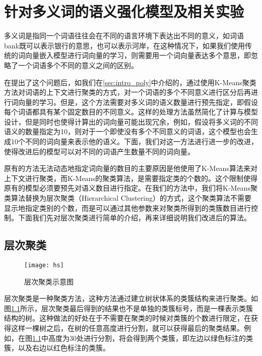 \iffalse



\fi

\chapter{针对多义词的语义强化模型及相关实验}

多义词是指同一个词语往往会在不同的语言环境下表达出不同的意义，如词语bank既可以表示银行的意思，也可以表示河岸，在这种情况下，如果我们使用传统的词向量嵌入模型进行词向量的学习，则需要用一个词向量表达多个意思，即忽略了一个词语多个不同的意义之间的区别。

在\citep{bengio2006neural}提出了这个问题后，如我们在\ref{sec:intro_poly}中介绍的，\citep{huang2012improving}通过使用K-Means聚类方法对词语的上下文进行聚类的方式，对一个词语的多个不同意义进行区分后再进行词向量的学习。但是，这个方法需要对多义词的语义数量进行预先指定，即假设每个词语都具有某个固定数目的不同意义。这样的处理方法虽然简化了计算与模型设计，但是同时也使得计算出的词向量可能出现冗余，例如，假设将多义词的不同语义的数量指定为10，则对于一个即使没有多个不同意义的词语，这个模型也会生成10个不同的词向量来表示他的语义。下面，我们对这一方法进行进一步的改进，使得改进后的模型可以对不同的词语产生数量不同的词向量。

原有的方法无法动态地指定词向量的数目的主要原因是他使用了K-Means算法来对上下文进行聚类，而K-Means的聚类算法，是需要指定类的个数的。这个限制使得原有的模型必须要预先对语义数目进行指定。在我们的方法中，我们将K-Means聚类算法替换为层次聚类（Hierarchical Clustering）\cite{johnson1967hierarchical}的方式，这个聚类算法不需要显示地指定类别的个数，而是可以通过其他参数来对聚类所得到的类簇数目进行控制。下面我们先对层次聚类进行简单的介绍，再来详细说明我们改进后的算法。

\section{层次聚类}

\begin{figure}
\centering
\texttt{[image: hs]}
\caption{层次聚类示意图}
\label{fig:hs}
\end{figure}

层次聚类是一种聚类方法，这种方法通过建立树状体系的类簇结构来进行聚类。如图\ref{fig:hs}所示，层次聚类最后得到的结果也不是单独的类簇标号，而是一棵表示类簇结构的树。这种做法的好处在于不需要在聚类的时候对类簇的个数进行限定，在获得这样一棵树之后，在树的任意高度进行分割，就可以获得最后的聚类结果。例如，在图\ref{fig:hs}中高度为30处进行分割，将会得到两个类簇，即左边以绿色标注的类簇，以及右边以红色标注的类簇。

